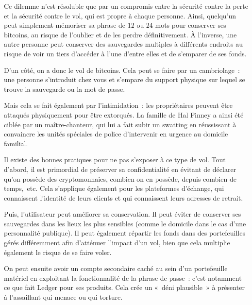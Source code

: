 Ce dilemme n'est résoluble que par un compromis entre la sécurité contre la perte et la sécurité contre le vol, qui est propre à chaque personne. Ainsi, quelqu'un peut simplement mémoriser sa phrase de 12 ou 24 mots pour conserver ses bitcoins, au risque de l'oublier et de les perdre définitivement. À l'inverse, une autre personne peut conserver des sauvegardes multiples à différents endroits au risque de voir un tiers d'accéder à l'une d'entre elles et de s'emparer de ses fonds.

D'un côté, on a donc le vol de bitcoins. Cela peut se faire par un cambriolage~: une personne s'introduit chez vous et s'empare du support physique sur lequel se trouve la sauvegarde ou la mot de passe.

Mais cela se fait également par l'intimidation~: les propriétaires peuvent être attaqués physiquement pour être extorqués. La famille de Hal Finney a ainsi été ciblée par un maître-chanteur, qui lui a fait subir un swatting en réussissant à convaincre les unités spéciales de police d'intervenir en urgence au domicile familial.

Il existe des bonnes pratiques pour ne pas s'exposer à ce type de vol. Tout d'abord, il est primordial de préserver sa confidentialité en évitant de déclarer qu'on possède des cryptomonnaies, combien on en possède, depuis combien de temps,~etc. Cela s'applique également pour les plateformes d'échange, qui connaissent l'identité de leurs clients et qui connaissent leurs adresses de retrait.

Puis, l'utilisateur peut améliorer sa conservation. Il peut éviter de conserver ses sauvegardes dans les lieux les plus sensibles (comme le domicile dans le cas d'une personnalité publique). Il peut également répartir les fonds dans des portefeuilles gérés différemment afin d'atténuer l'impact d'un vol, bien que cela multiplie également le risque de se faire voler.

On peut ensuite avoir un compte secondaire caché au sein d'un portefeuille matériel en exploitant la fonctionnalité de la phrase de passe~: c'est notamment ce que fait Ledger pour ses produits. Cela crée un «~déni plausible~» à présenter à l'assaillant qui menace ou qui torture.

